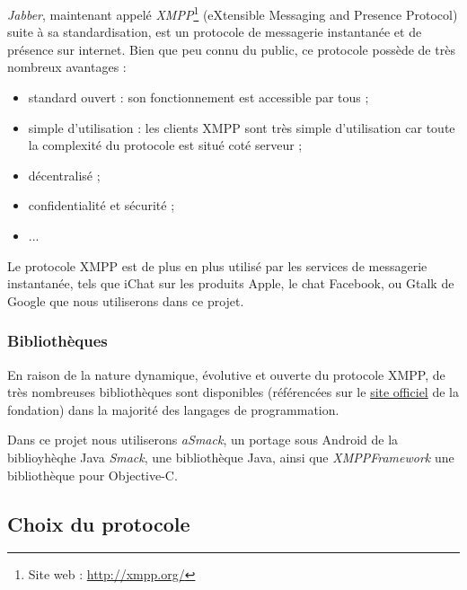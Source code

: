 \textit{Jabber}, maintenant appelé \textit{XMPP}\footnote{Site web : \href{http://xmpp.org/}{http://xmpp.org/}} (eXtensible Messaging and Presence Protocol) suite à sa standardisation, est un protocole de messagerie instantanée et de présence sur internet.
Bien que peu connu du public, ce protocole possède de très nombreux avantages :
\begin{itemize}
	\item standard ouvert : son fonctionnement est accessible par tous ;
	\item simple d'utilisation : les clients XMPP sont très simple d'utilisation car toute la complexité du protocole est situé coté serveur ;
	\item décentralisé ;
	\item confidentialité et sécurité ;
	\item ...
\\
\end{itemize}


Le protocole XMPP est de plus en plus utilisé par les services de messagerie instantanée, tels que iChat sur les produits Apple, le chat Facebook, ou Gtalk de Google que nous utiliserons dans ce projet.


\subsubsection{Bibliothèques}

En raison de la nature dynamique, évolutive et ouverte du protocole XMPP, de très nombreuses bibliothèques sont disponibles (référencées sur le \href{http://xmpp.org/xmpp-software/libraries/}{site officiel} de la fondation) dans la majorité des langages de programmation.

Dans ce projet nous utiliserons \textit{aSmack}, un portage sous Android de la biblioyhèqhe Java \textit{Smack}, une bibliothèque Java, ainsi que \textit{XMPPFramework} une bibliothèque pour Objective-C.




\subsection{Choix du protocole}

